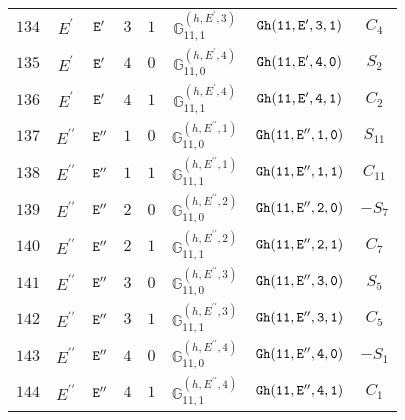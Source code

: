 \documentclass[fleqn,8pt]{jsarticle}
\begin{document}
\begin{table}[ht!]
\begin{center}
\begin{tabular}{cccccccc}
$ 134 $ & $ E^{\prime} $ & $ {\tt E'} $ & $ 3 $ & $ 1 $ & $ \mathbb{G}_{11,1}^{(h,E^{\prime},3)} $ & $ {\tt Gh(11,E',3,1)} $ & $ C_{4} $ \\
$ 135 $ & $ E^{\prime} $ & $ {\tt E'} $ & $ 4 $ & $ 0 $ & $ \mathbb{G}_{11,0}^{(h,E^{\prime},4)} $ & $ {\tt Gh(11,E',4,0)} $ & $ S_{2} $ \\
$ 136 $ & $ E^{\prime} $ & $ {\tt E'} $ & $ 4 $ & $ 1 $ & $ \mathbb{G}_{11,1}^{(h,E^{\prime},4)} $ & $ {\tt Gh(11,E',4,1)} $ & $ C_{2} $ \\
$ 137 $ & $ E^{\prime\prime} $ & $ {\tt E''} $ & $ 1 $ & $ 0 $ & $ \mathbb{G}_{11,0}^{(h,E^{\prime\prime},1)} $ & $ {\tt Gh(11,E'',1,0)} $ & $ S_{11} $ \\
$ 138 $ & $ E^{\prime\prime} $ & $ {\tt E''} $ & $ 1 $ & $ 1 $ & $ \mathbb{G}_{11,1}^{(h,E^{\prime\prime},1)} $ & $ {\tt Gh(11,E'',1,1)} $ & $ C_{11} $ \\
$ 139 $ & $ E^{\prime\prime} $ & $ {\tt E''} $ & $ 2 $ & $ 0 $ & $ \mathbb{G}_{11,0}^{(h,E^{\prime\prime},2)} $ & $ {\tt Gh(11,E'',2,0)} $ & $ - S_{7} $ \\
$ 140 $ & $ E^{\prime\prime} $ & $ {\tt E''} $ & $ 2 $ & $ 1 $ & $ \mathbb{G}_{11,1}^{(h,E^{\prime\prime},2)} $ & $ {\tt Gh(11,E'',2,1)} $ & $ C_{7} $ \\
$ 141 $ & $ E^{\prime\prime} $ & $ {\tt E''} $ & $ 3 $ & $ 0 $ & $ \mathbb{G}_{11,0}^{(h,E^{\prime\prime},3)} $ & $ {\tt Gh(11,E'',3,0)} $ & $ S_{5} $ \\
$ 142 $ & $ E^{\prime\prime} $ & $ {\tt E''} $ & $ 3 $ & $ 1 $ & $ \mathbb{G}_{11,1}^{(h,E^{\prime\prime},3)} $ & $ {\tt Gh(11,E'',3,1)} $ & $ C_{5} $ \\
$ 143 $ & $ E^{\prime\prime} $ & $ {\tt E''} $ & $ 4 $ & $ 0 $ & $ \mathbb{G}_{11,0}^{(h,E^{\prime\prime},4)} $ & $ {\tt Gh(11,E'',4,0)} $ & $ - S_{1} $ \\
$ 144 $ & $ E^{\prime\prime} $ & $ {\tt E''} $ & $ 4 $ & $ 1 $ & $ \mathbb{G}_{11,1}^{(h,E^{\prime\prime},4)} $ & $ {\tt Gh(11,E'',4,1)} $ & $ C_{1} $ \\
 \hline \hline
\end{tabular}
\end{center}
\end{table}
\end{document}

